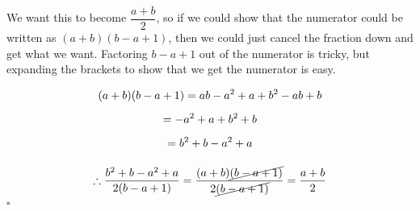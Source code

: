 \documentclass[a4paper]{article}
\begin{document}
\newpage

We want this to become $\dfrac{a + b}{2}$, so if we could show that the numerator could be written as $(a + b)(b - a + 1)$, then we could just cancel the fraction down and get what we want. Factoring $b - a + 1$ out of the numerator is tricky, but expanding the brackets to show that we get the numerator is easy.

\begin{gather*}
(a + b)(b - a + 1) = ab - a^2 + a + b^2 - ab + b\\[0.5em]
= -a^2 + a + b^2 + b\\[0.5em]
= b^2 + b - a^2 + a\\[1em]
\therefore \frac{b^2 + b - a^2 + a}{2(b - a + 1)} = \frac{(a + b)\cancel{(b - a + 1)}}{2\cancel{(b - a + 1)}} = \frac{a + b}{2}
\end{gather*}
\hspace*{\fill}$\square$
\end{document}
